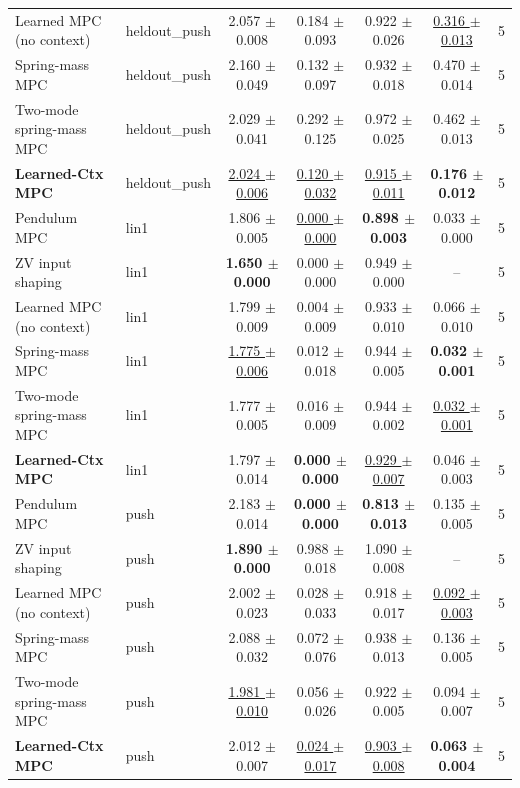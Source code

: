\begin{tabular}{llccccc}
Learned MPC (no context) & heldout\_push & 2.057 $\pm$ 0.008 & 0.184 $\pm$ 0.093 & 0.922 $\pm$ 0.026 & \underline{0.316 $\pm$ 0.013} & 5 \\
Spring-mass MPC & heldout\_push & 2.160 $\pm$ 0.049 & 0.132 $\pm$ 0.097 & 0.932 $\pm$ 0.018 & 0.470 $\pm$ 0.014 & 5 \\
Two-mode spring-mass MPC & heldout\_push & 2.029 $\pm$ 0.041 & 0.292 $\pm$ 0.125 & 0.972 $\pm$ 0.025 & 0.462 $\pm$ 0.013 & 5 \\
\textbf{Learned-Ctx MPC} & heldout\_push & \underline{2.024 $\pm$ 0.006} & \underline{0.120 $\pm$ 0.032} & \underline{0.915 $\pm$ 0.011} & \textbf{0.176 $\pm$ 0.012} & 5 \\
\midrule
Pendulum MPC & lin1 & 1.806 $\pm$ 0.005 & \underline{0.000 $\pm$ 0.000} & \textbf{0.898 $\pm$ 0.003} & 0.033 $\pm$ 0.000 & 5 \\
ZV input shaping & lin1 & \textbf{1.650 $\pm$ 0.000} & 0.000 $\pm$ 0.000 & 0.949 $\pm$ 0.000 & -- & 5 \\
Learned MPC (no context) & lin1 & 1.799 $\pm$ 0.009 & 0.004 $\pm$ 0.009 & 0.933 $\pm$ 0.010 & 0.066 $\pm$ 0.010 & 5 \\
Spring-mass MPC & lin1 & \underline{1.775 $\pm$ 0.006} & 0.012 $\pm$ 0.018 & 0.944 $\pm$ 0.005 & \textbf{0.032 $\pm$ 0.001} & 5 \\
Two-mode spring-mass MPC & lin1 & 1.777 $\pm$ 0.005 & 0.016 $\pm$ 0.009 & 0.944 $\pm$ 0.002 & \underline{0.032 $\pm$ 0.001} & 5 \\
\textbf{Learned-Ctx MPC} & lin1 & 1.797 $\pm$ 0.014 & \textbf{0.000 $\pm$ 0.000} & \underline{0.929 $\pm$ 0.007} & 0.046 $\pm$ 0.003 & 5 \\
\midrule
Pendulum MPC & push & 2.183 $\pm$ 0.014 & \textbf{0.000 $\pm$ 0.000} & \textbf{0.813 $\pm$ 0.013} & 0.135 $\pm$ 0.005 & 5 \\
ZV input shaping & push & \textbf{1.890 $\pm$ 0.000} & 0.988 $\pm$ 0.018 & 1.090 $\pm$ 0.008 & -- & 5 \\
Learned MPC (no context) & push & 2.002 $\pm$ 0.023 & 0.028 $\pm$ 0.033 & 0.918 $\pm$ 0.017 & \underline{0.092 $\pm$ 0.003} & 5 \\
Spring-mass MPC & push & 2.088 $\pm$ 0.032 & 0.072 $\pm$ 0.076 & 0.938 $\pm$ 0.013 & 0.136 $\pm$ 0.005 & 5 \\
Two-mode spring-mass MPC & push & \underline{1.981 $\pm$ 0.010} & 0.056 $\pm$ 0.026 & 0.922 $\pm$ 0.005 & 0.094 $\pm$ 0.007 & 5 \\
\textbf{Learned-Ctx MPC} & push & 2.012 $\pm$ 0.007 & \underline{0.024 $\pm$ 0.017} & \underline{0.903 $\pm$ 0.008} & \textbf{0.063 $\pm$ 0.004} & 5 \\
\bottomrule
\end{tabular}
